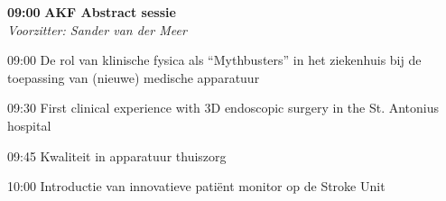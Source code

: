 \documentclass[a4paper,10pt]{report}
\begin{document}
\begin{multicols*}{3}
\vfill

\begin{packed_enum}
\item[\textbf{09:00}] \textbf{AKF Abstract sessie}\\\textit{Voorzitter: Sander van der Meer}
\item[09:00] De rol van klinische fysica als ``Mythbusters'' in het zieken\-huis bij de toe\-passing van (nieuwe) medische appara\-tuur
\item[09:30] First clinical experience with 3D endoscopic surgery in the St. Antonius hospital
\item[09:45] Kwaliteit in apparatuur thuiszorg
\item[10:00] Introductie van innovatieve patiënt monitor op de Stroke Unit
\end{packed_enum} %




\end{multicols*}
\end{document}
